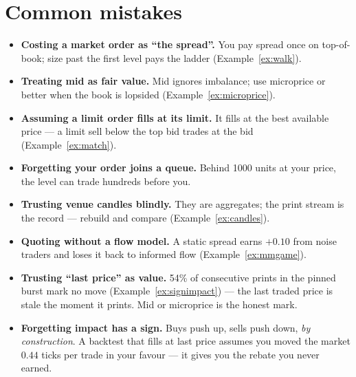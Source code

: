\section{Common mistakes}
\begin{itemize}
\item \textbf{Costing a market order as ``the spread''.} You pay
spread once on top-of-book; size past the first level pays the
ladder (Example~\ref{ex:walk}).
\item \textbf{Treating mid as fair value.} Mid ignores imbalance;
use microprice or better when the book is lopsided
(Example~\ref{ex:microprice}).
\item \textbf{Assuming a limit order fills at its limit.} It fills
at the best available price --- a limit sell below the top bid
trades at the bid (Example~\ref{ex:match}).
\item \textbf{Forgetting your order joins a queue.} Behind 1000
units at your price, the level can trade hundreds before you.
\item \textbf{Trusting venue candles blindly.} They are aggregates;
the print stream is the record --- rebuild and compare
(Example~\ref{ex:candles}).
\item \textbf{Quoting without a flow model.} A static spread earns
$+0.10$ from noise traders and loses it back to informed flow
(Example~\ref{ex:mmgame}).
\item \textbf{Trusting ``last price'' as value.} 54\% of
consecutive prints in the pinned burst mark no move
(Example~\ref{ex:signimpact}) --- the last traded price is stale the
moment it prints. Mid or microprice is the honest mark.
\item \textbf{Forgetting impact has a sign.} Buys push up, sells
push down, \emph{by construction}. A backtest that fills at last
price assumes you moved the market $0.44$ ticks per trade in your
favour --- it gives you the rebate you never earned.
\end{itemize}

